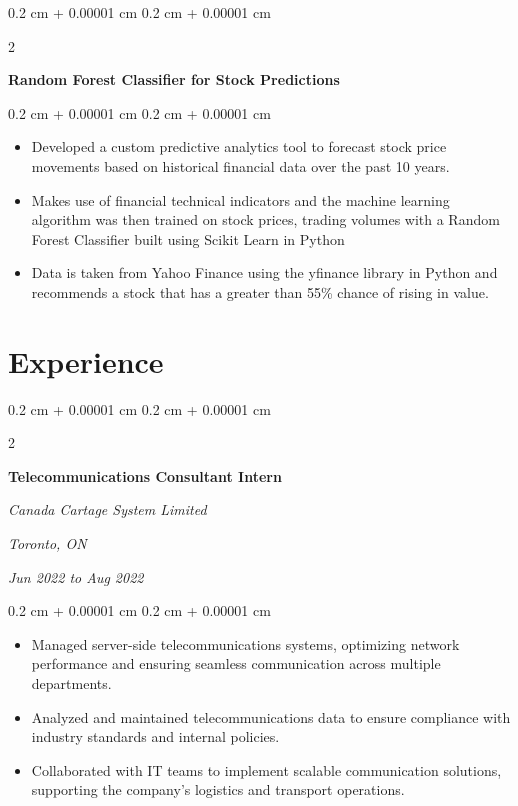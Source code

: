 \documentclass[10pt, letterpaper]{article}
\newenvironment{highlights}{
    \begin{itemize}[
        topsep=0.10 cm,
        parsep=0.10 cm,
        partopsep=0pt,
        itemsep=0pt,
        leftmargin=0.4 cm + 10pt
    ]
}{
    \end{itemize}
} %
\newenvironment{onecolentry}{
    \begin{adjustwidth}{
        0.2 cm + 0.00001 cm
    }{
        0.2 cm + 0.00001 cm
    }
}{
    \end{adjustwidth}
} %
\newenvironment{twocolentry}[2][]{
    \onecolentry
    \def\secondColumn{#2}
    \setcolumnwidth{\fill, 4.5 cm}
    \begin{paracol}{2}
}{
    \switchcolumn \raggedleft \secondColumn
    \end{paracol}
    \endonecolentry
} %
\let\hrefWithoutArrow\href
\renewcommand{\href}[2]{\hrefWithoutArrow{#1}{\ifthenelse{\equal{#2}{}}{ }{#2 }\raisebox{.15ex}{\footnotesize \faExternalLink*}}}
\begin{document}
        \vspace{0.2 cm}

        \begin{twocolentry}{
            
            
        \textit{\href{https://github.com/akramj13/ai-stock-predictor}{GitHub Link}}}
            \textbf{Random Forest Classifier for Stock Predictions}
        \end{twocolentry}

        \vspace{0.10 cm}
        \begin{onecolentry}
            \begin{highlights}
                \item Developed a custom predictive analytics tool to forecast stock price movements based on historical financial data over the past 10 years.
                \item Makes use of financial technical indicators and the machine learning algorithm was then trained on stock prices, trading volumes with a Random Forest Classifier built using Scikit Learn in Python
                \item Data is taken from Yahoo Finance using the yfinance library in Python and recommends a stock that has a greater than 55\% chance of rising in value.
            \end{highlights}
        \end{onecolentry}



    
    \section{Experience}



        
        \begin{twocolentry}{
        \textit{Toronto, ON}    
            
        \textit{Jun 2022 to Aug 2022}}
            \textbf{Telecommunications Consultant Intern}
            
            \textit{Canada Cartage System Limited}
        \end{twocolentry}

        \vspace{0.10 cm}
        \begin{onecolentry}
            \begin{highlights}
                \item Managed server-side telecommunications systems, optimizing network performance and ensuring seamless communication across multiple departments.
                \item Analyzed and maintained telecommunications data to ensure compliance with industry standards and internal policies.
                \item Collaborated with IT teams to implement scalable communication solutions, supporting the company's logistics and transport operations.
            \end{highlights}
        \end{onecolentry}
\end{document}
